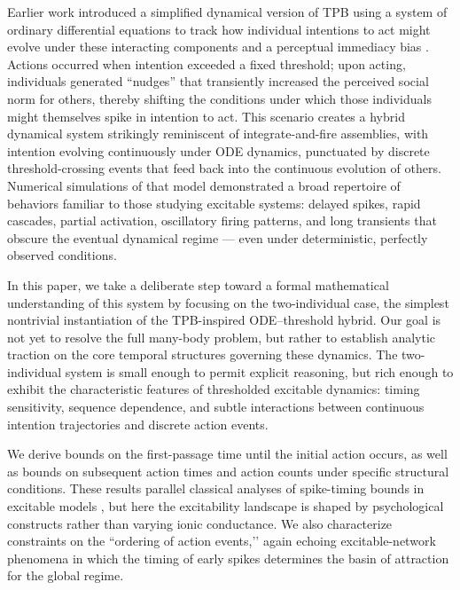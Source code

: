 \documentclass[preprint,12pt]{elsarticle}
\begin{document}
Earlier work introduced a simplified dynamical version of TPB using a system of ordinary differential equations to track how individual intentions to act might evolve under these interacting components and a perceptual immediacy bias \cite{schwarze2024planned}. Actions occurred when intention exceeded a fixed threshold; upon acting, individuals generated “nudges” that transiently increased the perceived social norm for others, thereby shifting the conditions under which those individuals might themselves spike in intention to act. This scenario creates a hybrid dynamical system strikingly reminiscent of integrate-and-fire assemblies, with intention evolving continuously under ODE dynamics, punctuated by discrete threshold-crossing events that feed back into the continuous evolution of others. Numerical simulations of that model demonstrated a broad repertoire of behaviors familiar to those studying excitable systems: delayed spikes, rapid cascades, partial activation, oscillatory firing patterns, and long transients that obscure the eventual dynamical regime — even under deterministic, perfectly observed conditions.

In this paper, we take a deliberate step toward a formal mathematical understanding of this system by focusing on the two-individual case, the simplest nontrivial instantiation of the TPB-inspired ODE–threshold hybrid. Our goal is not yet to resolve the full many-body problem, but rather to establish analytic traction on the core temporal structures governing these dynamics. The two-individual system is small enough to permit explicit reasoning, but rich enough to exhibit the characteristic features of thresholded excitable dynamics: timing sensitivity, sequence dependence, and subtle interactions between continuous intention trajectories and discrete action events.

We derive bounds on the first-passage time until the initial action occurs, as well as bounds on subsequent action times and action counts under specific structural conditions. These results parallel classical analyses of spike-timing bounds in excitable models \cite{izhikevich2007dynamical, brette2015philosophy, markram2011history}, but here the excitability landscape is shaped by psychological constructs rather than varying ionic conductance. We also characterize constraints on the ``ordering of action events,’’ again echoing excitable-network phenomena in which the timing of early spikes determines the basin of attraction for the global regime.
\end{document}
